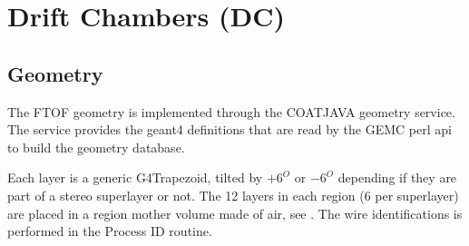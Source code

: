 \section{Drift Chambers (DC)}

\subsection{Geometry}

The FTOF geometry is implemented through the COATJAVA geometry service.
The service provides the geant4 definitions that are read by the GEMC perl api to build the geometry database.

Each layer is a generic G4Trapezoid, tilted by $+6^O$ or $-6^O$ depending if they are part of a stereo superlayer or not.
The 12 layers in each region (6 per superlayer) are placed in a region mother volume made of air, see .
The wire identifications is performed in the Process ID routine.

